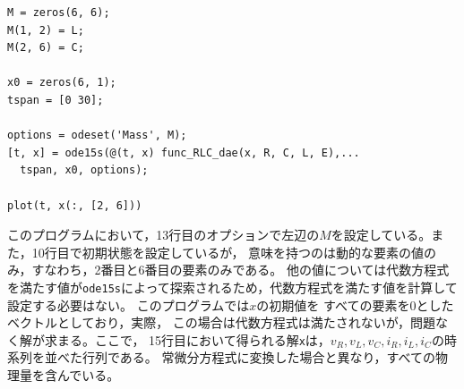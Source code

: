 \documentclass[tombow,dvipdfmx]{corona-a5-1.1}
\begin{document}
\begin{例}[簡単な例題]
\begin{PROGRAMA}[count,title={main\_RLC\_dae.m}]
\begin{verbatim}
M = zeros(6, 6);
M(1, 2) = L;
M(2, 6) = C;

x0 = zeros(6, 1);
tspan = [0 30];

options = odeset('Mass', M);
[t, x] = ode15s(@(t, x) func_RLC_dae(x, R, C, L, E),...
  tspan, x0, options);

plot(t, x(:, [2, 6]))
\end{verbatim}
\end{PROGRAMA}
このプログラムにおいて，13行目のオプションで左辺の$M$を設定している。また，10行目で初期状態を設定しているが，
意味を持つのは動的な要素の値のみ，すなわち，2番目と6番目の要素のみである。
他の値については代数方程式を満たす値が\verb|ode15s|によって探索されるため，代数方程式を満たす値を計算して設定する必要はない。
このプログラムでは$x$の初期値を
すべての要素を$0$としたベクトルとしており，実際，
この場合は代数方程式は満たされないが，問題なく解が求まる。ここで，
15行目において得られる解\verb|x|は，$v_R, v_L, v_C, i_R, i_L, i_C$の時系列を並べた行列である。
常微分方程式に変換した場合と異なり，すべての物理量を含んでいる。


\end{例}
\end{document}
